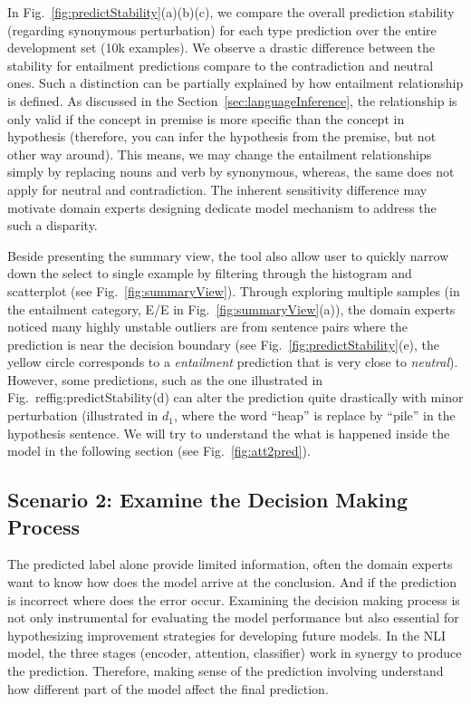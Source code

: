 In Fig.~\ref{fig:predictStability}(a)(b)(c),  %
we compare the overall prediction stability (regarding synonymous perturbation) for each type prediction over the entire development set (10k examples).
%
We observe a drastic difference between the stability for entailment predictions compare to the contradiction and neutral ones.
%
Such a distinction can be partially explained by how entailment relationship is defined. As discussed in the Section~\ref{sec:languageInference}, the relationship is only valid if the concept in premise is more specific than the concept in hypothesis (therefore, you can infer the hypothesis from the premise, but not other way around). This means, we may change the entailment relationships simply by replacing nouns and verb by synonymous, whereas, the same does not apply for neutral and contradiction.
%
The inherent sensitivity difference may motivate domain experts designing dedicate model mechanism to address the such a disparity.

Beside presenting the summary view, the tool also allow user to quickly narrow down the select to single example  by filtering through the histogram and scatterplot (see Fig.~\ref{fig:summaryView}). 
%
Through exploring multiple samples (in the entailment category, E/E in Fig.~\ref{fig:summaryView}(a)), the domain experts noticed many highly unstable outliers are from sentence pairs where the prediction is near the decision boundary (see Fig.~\ref{fig:predictStability}(e), the yellow circle corresponds to a \emph{entailment} prediction that is very close to \emph{neutral}). 
However, some predictions, such as the one illustrated in Fig.~ref{fig:predictStability}(d) can alter the prediction quite drastically with minor perturbation (illustrated in $d_1$, where the word ``heap'' is replace by ``pile'' in the hypothesis sentence. We will try to understand the what is happened inside the model in the following section (see Fig.~\ref{fig:att2pred}).

\subsection{Scenario 2: Examine the Decision Making Process}
The predicted label alone provide limited information, often the domain experts want to know how does the model arrive at the conclusion. And if the prediction is incorrect where does the error occur.
%
Examining the decision making process is not only instrumental for evaluating the model performance but also essential for hypothesizing improvement strategies for developing future models.
%
In the NLI model, the three stages (encoder, attention, classifier) work in synergy to produce the prediction.
Therefore, making sense of the prediction involving understand how different part of the model affect the final prediction.

